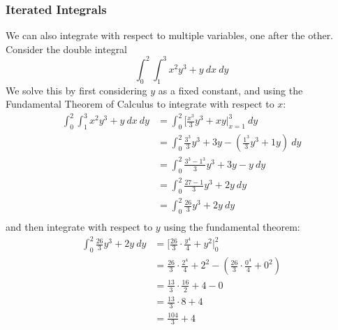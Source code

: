 \begin{samepage}
\subsubsection{Iterated Integrals}

    We can also integrate with respect to multiple variables, one after the other. Consider the 
    double integral
    \begin{equation*}
    \int_0^2 \int_1^3 x^2 y^3 + y\ dx\ dy
    \end{equation*}
    We solve this by first considering $y$ as a fixed constant, and using the Fundamental Theorem of 
    Calculus to integrate with respect to $x$:
    \begin{equation*}
        \begin{aligned}
            \int_0^2 \int_1^3 x^2 y^3 + y\ dx\ dy & = \int_0^2 \Big[ \frac{x^3}{3} y^3 + xy \Big|_{x = 1}^3  \ dy \\ 
            & = \int_0^2 \frac{3^3}{3} y^3 + 3y - \left(\frac{1^3}{3} y^3 + 1y\right)\ dy \\ 
            & = \int_0^2 \frac{3^3 - 1^3}{3} y^3 + 3y - y\ dy \\ 
            & = \int_0^2 \frac{27 - 1}{3} y^3 + 2y\ dy \\ 
            & = \int_0^2 \frac{26}{3} y^3 + 2y\ dy \\ 
        \end{aligned}
    \end{equation*}
    and then integrate with respect to $y$ using the fundamental theorem:
    \begin{equation*}
        \begin{aligned}
            \int_0^2 \frac{26}{3} y^3 + 2y\ dy & = \Big[\frac{26}{3} \cdot \frac{y^4}{4} + y^2 \Big|_0^2 \\ 
            & = \frac{26}{3}\cdot  \frac{2^4}{4} + 2^2 - \left(\frac{26}{3} \cdot \frac{0^4}{4} + 0^2\right) \\ 
            & = \frac{13}{3} \cdot \frac{16}{2} + 4 - 0 \\ 
            & = \frac{13}{3} \cdot 8 + 4 \\ 
            & = \boxed{\frac{104}{3} + 4}
        \end{aligned}
    \end{equation*}
\end{samepage}

